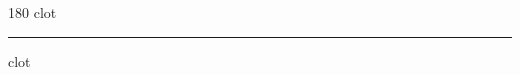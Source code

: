 
\begin{frame}
\begin{center}
\begin{turn}{180}
{\fontsize{2.5cm}{1em}\selectfont clot}
\end{turn}
\vspace{1em}\par  
\hrule
\vspace{1em}\par  
{\fontsize{2.5cm}{1em}\selectfont clot}
\end{center}
\end{frame}
